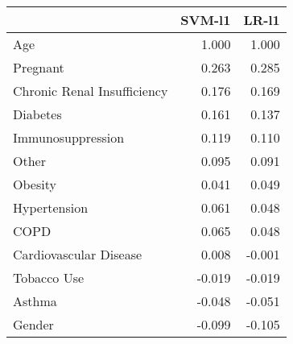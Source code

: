 \begin{tabular}{lrr}
\toprule
{} &  SVM-l1 &  LR-l1 \\
\midrule
Age                         &   1.000 &  1.000 \\
Pregnant                    &   0.263 &  0.285 \\
Chronic Renal Insufficiency &   0.176 &  0.169 \\
Diabetes                    &   0.161 &  0.137 \\
Immunosuppression           &   0.119 &  0.110 \\
Other                       &   0.095 &  0.091 \\
Obesity                     &   0.041 &  0.049 \\
Hypertension                &   0.061 &  0.048 \\
COPD                        &   0.065 &  0.048 \\
Cardiovascular Disease      &   0.008 & -0.001 \\
Tobacco Use                 &  -0.019 & -0.019 \\
Asthma                      &  -0.048 & -0.051 \\
Gender                      &  -0.099 & -0.105 \\
\bottomrule
\end{tabular}
